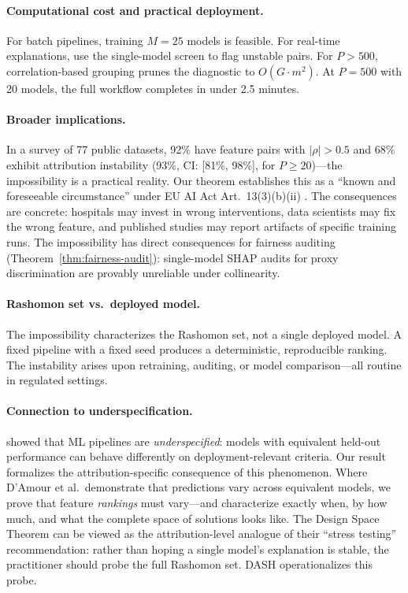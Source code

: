 \documentclass{jmlr}
\begin{document}
\paragraph{Computational cost and practical deployment.}
For batch pipelines, training $M{=}25$ models is feasible. For real-time explanations, use the single-model screen to flag unstable pairs. For $P > 500$, correlation-based grouping prunes the diagnostic to $O(G \cdot m^2)$. At $P{=}500$ with 20 models, the full workflow completes in under 2.5 minutes.

\paragraph{Broader implications.}
In a survey of 77 public datasets, 92\% have feature pairs with $|\rho| > 0.5$ and 68\% exhibit attribution instability (93\%, CI: [81\%, 98\%], for $P \geq 20$)---the impossibility is a practical reality. Our theorem establishes this as a ``known and foreseeable circumstance'' under EU AI Act Art.~13(3)(b)(ii) \citep{euaiact2024}.
The consequences are concrete: hospitals may invest in wrong interventions, data scientists may fix the wrong feature, and published studies may report artifacts of specific training runs.
The impossibility has direct consequences for fairness auditing (Theorem~\ref{thm:fairness-audit}): single-model SHAP audits for proxy discrimination are provably unreliable under collinearity.

\paragraph{Rashomon set vs.\ deployed model.}
The impossibility characterizes the Rashomon set, not a single deployed model. A fixed pipeline with a fixed seed produces a deterministic, reproducible ranking. The instability arises upon retraining, auditing, or model comparison---all routine in regulated settings.

\paragraph{Connection to underspecification.}
\citet{damour2022underspecification} showed that ML pipelines are \emph{underspecified}: models with equivalent held-out performance can behave differently on deployment-relevant criteria. Our result formalizes the attribution-specific consequence of this phenomenon. Where D'Amour et al.\ demonstrate that predictions vary across equivalent models, we prove that feature \emph{rankings} must vary---and characterize exactly when, by how much, and what the complete space of solutions looks like. The Design Space Theorem can be viewed as the attribution-level analogue of their ``stress testing'' recommendation: rather than hoping a single model's explanation is stable, the practitioner should probe the full Rashomon set. DASH operationalizes this probe.
\end{document}
